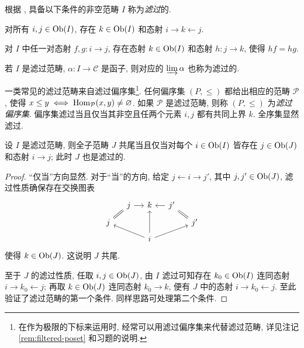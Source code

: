 \begin{definition}
	根据 \cite[定义 2.7.6]{Li1}, 具备以下条件的非空范畴 $I$ 称为\emph{滤过}的.
	\begin{compactitem}
		\item 对所有 $i, j \in \operatorname{Ob}(I)$, 存在 $k \in \operatorname{Ob}(I)$ 和态射 $i \rightarrow k \leftarrow j$.
		\item 对 $I$ 中任一对态射 $f, g: i \to j$, 存在态射 $k \in \operatorname{Ob}(I)$ 和态射 $h: j \to k$, 使得 $hf = hg$.
	\end{compactitem}

	若 $I$ 是滤过范畴, $\alpha: I \to \mathcal{C}$ 是函子, 则对应的 $\varinjlim \alpha$ 也称为滤过的.
\end{definition}

\begin{example}\label{eg:filtered-poset}
	一类常见的滤过范畴来自滤过偏序集\footnote{在作为极限的下标来运用时, 经常可以用滤过偏序集来代替滤过范畴, 详见注记 \ref{rem:filtered-poset} 和习题的说明.}. 任何偏序集 $(P, \leq)$ 都给出相应的范畴 $\mathcal{P}$, 使得 $x \leq y  \iff \operatorname{Hom}_{\mathcal{P}}(x, y) \neq \varnothing$. 如果 $\mathcal{P}$ 是滤过范畴, 则称 $(P, \leq)$ 为\emph{滤过偏序集}. 偏序集滤过当且仅当其非空且任两个元素 $i, j$ 都有共同上界 $k$. 全序集显然滤过.
\end{example}

\begin{proposition}\label{prop:cofinal-filtered}
	设 $I$ 是滤过范畴, 则全子范畴 $J$ 共尾当且仅当对每个 $i \in \operatorname{Ob}(I)$ 皆存在 $j \in \operatorname{Ob}(J)$ 和态射 $i \to j$; 此时 $J$ 也是滤过的.
\end{proposition}
\begin{proof}
	``仅当''方向显然. 对于``当''的方向, 给定 $j \leftarrow i \to j'$, 其中 $j, j' \in \operatorname{Ob}(J)$, 滤过性质确保存在交换图表
	\[\begin{tikzcd}[row sep=tiny, column sep=small]
		& j \arrow[r] & k & j' \arrow[l] & \\
		j \arrow[equal, ru] & & & & j' \arrow[equal, lu] \\
		& & i \arrow[llu] \arrow[uu] \arrow[rru] & &
	\end{tikzcd}\]
	使得 $k \in \operatorname{Ob}(J)$. 这说明 $J$ 共尾.
	
	至于 $J$ 的滤过性质, 任取 $i, j \in \operatorname{Ob}(J)$, 由 $I$ 滤过可知存在 $k_0 \in \operatorname{Ob}(I)$ 连同态射 $i \rightarrow k_0 \leftarrow j$; 再取 $k \in \operatorname{Ob}(J)$ 连同态射 $k_0 \to k$, 便有 $J$ 中的态射 $i \rightarrow k_0 \leftarrow j$. 至此验证了滤过范畴的第一个条件. 同样思路可处理第二个条件.
\end{proof}

